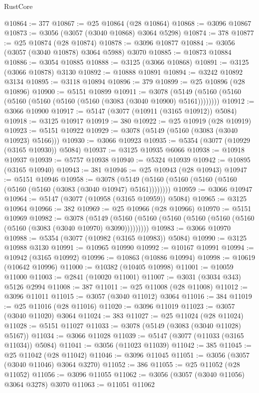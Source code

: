 \begin{lexlean}{RustCore}
\begin{coremodule}
@10864 := 377
@10867 := @25 @10864 (@28 @10864)
@10868 := @3096 @10867
@10873 := @3056 (@3057 (@3040 @10868) @3064 @5298)
@10874 := 378
@10877 := @25 @10874 (@28 @10874)
@10878 := @3096 @10877
@10884 := @3056 (@3057 (@3040 @10878) @3064 @5988) @3070
@10885 := @10873 @10884
@10886 := @3054 @10885
@10888 := @3125 (@3066 @10868)
@10891 := @3125 (@3066 @10878) @3130
@10892 := @10888 @10891
@10894 := @3242 @10892 @3134
@10895 := @3118 @10894
@10896 := 379
@10899 := @25 @10896 (@28 @10896)
@10900 := @5151 @10899
@10911 := @3078 (@5149 (@5160 (@5160 (@5160 (@5160 (@5160 (@5160 (@3083 (@3040 @10900) @5161))))))))
@10912 := @3066 @10900
@10917 := @5147 (@3077 (@10911 (@3165 @10912)) @5084)
@10918 := @3125 @10917
@10919 := 380
@10922 := @25 @10919 (@28 @10919)
@10923 := @5151 @10922
@10929 := @3078 (@5149 (@5160 (@3083 (@3040 @10923) @5166)))
@10930 := @3066 @10923
@10935 := @5354 (@3077 (@10929 (@3165 @10930)) @5084)
@10937 := @3125 @10935 @6066
@10938 := @10918 @10937
@10939 := @5757 @10938
@10940 := @5324 @10939
@10942 := @10895 (@3165 @10940)
@10943 := 381
@10946 := @25 @10943 (@28 @10943)
@10947 := @5151 @10946
@10958 := @3078 (@5149 (@5160 (@5160 (@5160 (@5160 (@5160 (@5160 (@3083 (@3040 @10947) @5161))))))))
@10959 := @3066 @10947
@10964 := @5147 (@3077 (@10958 (@3165 @10959)) @5084)
@10965 := @3125 @10964
@10966 := 382
@10969 := @25 @10966 (@28 @10966)
@10970 := @5151 @10969
@10982 := @3078
    (@5149 (@5160 (@5160 (@5160 (@5160 (@5160 (@5160 (@5160 (@3083 (@3040 @10970) @3090)))))))))
@10983 := @3066 @10970
@10988 := @5354 (@3077 (@10982 (@3165 @10983)) @5084)
@10990 := @3125 @10988 @3130
@10991 := @10965 @10990
@10992 := @10167 @10991
@10994 := @10942 (@3165 @10992)
@10996 := @10863 (@10886 @10994)
@10998 := @10619 (@10642 @10996)
@11000 := @10382 (@10405 @10998)
@11001 := @10059 @11000
@11003 := @2841 (@10020 @11001)
@11007 := @3031 (@3034 @343) @5126 @2994
@11008 := 387
@11011 := @25 @11008 (@28 @11008)
@11012 := @3096 @11011
@11015 := @3057 (@3040 @11012) @3064
@11016 := 384
@11019 := @25 @11016 (@28 @11016)
@11020 := @3096 @11019
@11023 := @3057 (@3040 @11020) @3064
@11024 := 383
@11027 := @25 @11024 (@28 @11024)
@11028 := @5151 @11027
@11033 := @3078 (@5149 (@3083 (@3040 @11028) @5167))
@11034 := @3066 @11028
@11039 := @5147 (@3077 (@11033 (@3165 @11034)) @5084)
@11041 := @3056 (@11023 @11039)
@11042 := 385
@11045 := @25 @11042 (@28 @11042)
@11046 := @3096 @11045
@11051 := @3056 (@3057 (@3040 @11046) @3064 @3270)
@11052 := 386
@11055 := @25 @11052 (@28 @11052)
@11056 := @3096 @11055
@11062 := @3056 (@3057 (@3040 @11056) @3064 @3278) @3070
@11063 := @11051 @11062

\end{coremodule}
\end{lexlean}
